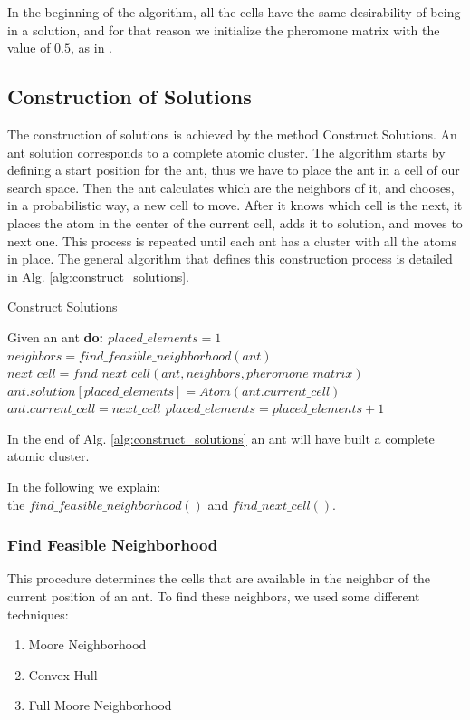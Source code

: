 	In the beginning of the algorithm, all the cells have the same desirability of being in a solution, and for that reason we initialize the pheromone matrix with the value of $0.5$, as in \cite{blum04}.
	\subsection{Construction of Solutions}
	The construction of solutions is achieved by the method Construct Solutions. An ant solution corresponds to a complete atomic cluster. The algorithm starts by defining a start position for the ant, thus we have to place the ant in a cell of our search space. Then the ant calculates which are the neighbors of it, and chooses, in a probabilistic way, a new cell to move. After it knows which cell is the next, it places the atom in the center of the current cell, adds it to solution, and moves to next one. This process is repeated until each ant has a cluster with all the atoms in place. The general algorithm that defines this construction process is detailed in Alg. \ref{alg:construct_solutions}.
	
	\begin{algorithm}
		\caption{Construct Solutions}
		\label{alg:construct_solutions}
		\begin{algorithmic}
		\STATE Given an ant \bf{do}:
		\STATE $placed\_elements = 1$
			\STATE $neighbors = find\_feasible\_neighborhood(ant)$
			\STATE $next\_cell = find\_next\_cell(ant, neighbors, pheromone\_matrix)$
			\STATE $ant.solution[placed\_elements] = Atom(ant.current\_cell)$
			\STATE $ant.current\_cell = next\_cell$
			\STATE $placed\_elements = placed\_elements + 1$			
		\ENDWHILE
		\end{algorithmic}
	\end{algorithm}
	\pagebreak
	In the end of Alg. \ref{alg:construct_solutions} an ant will have built a complete atomic cluster.
	
	In the following we explain:\\ the $find\_feasible\_neighborhood()$ and $find\_next\_cell()$. 
	
		\subsubsection*{Find Feasible Neighborhood}
		This procedure determines the cells that are available in the neighbor of the current position of an ant. To find these neighbors, we used some different techniques:
		\begin{enumerate}
			\item Moore Neighborhood
			\item Convex Hull
			\item Full Moore Neighborhood
		\end{enumerate}
	
